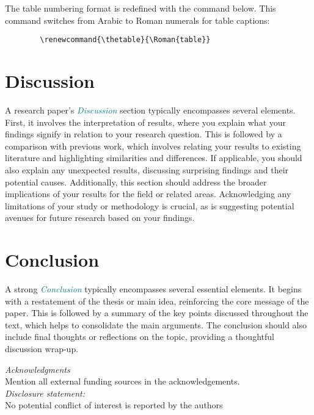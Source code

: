 \documentclass{article}
\renewcommand{\thetable}{\Roman{table}}
\begin{document}
The table numbering format is redefined with the command below. This command switches from Arabic to Roman numerals for table captions:
        \begin{verbatim} 
        \renewcommand{\thetable}{\Roman{table}} 
        \end{verbatim}


\section{Discussion}
\label{sec:discussion}
A research paper's \textcolor{teal}{\textit{Discussion}} section typically encompasses several elements. 
First, it involves the interpretation of results, where you explain what your findings signify in relation to your research question. 
This is followed by a comparison with previous work, which involves relating your results to existing literature and highlighting similarities and differences. 
If applicable, you should also explain any unexpected results, discussing surprising findings and their potential causes. 
Additionally, this section should address the broader implications of your results for the field or related areas. 
Acknowledging any limitations of your study or methodology is crucial, as is suggesting potential avenues for future research based on your findings.

\section{Conclusion}
\label{sec:conclusion}

A strong \textcolor{teal}{\textit{Conclusion}} typically encompasses several essential elements. It begins with a restatement of the thesis or main idea, reinforcing the core message of the paper. This is followed by a summary of the key points discussed throughout the text, which helps to consolidate the main arguments. The conclusion should also include final thoughts or reflections on the topic, providing a thoughtful discussion wrap-up. 

\hfill

\textit{Acknowledgments} \\Mention all external funding sources in the acknowledgements.\\

\textit{Disclosure statement:} \\No potential conflict of interest is reported by the authors




\printbibliography
\end{document}
